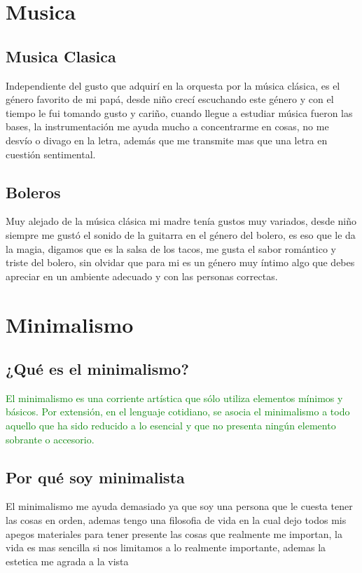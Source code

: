\documentclass[12pt, letterpaper]{article}
\begin{document}
\section{\huge{Musica}}
\subsection{\Large{Musica Clasica}}
Independiente del gusto que adquirí en la orquesta por la música clásica, es el género favorito de mi papá, desde niño crecí escuchando este género y con el tiempo le fui tomando gusto y cariño, cuando llegue a estudiar música fueron las bases, la instrumentación me ayuda mucho a concentrarme en cosas, no me desvío o divago en la letra, además que me transmite mas que una letra en cuestión sentimental.
\subsection{\Large{Boleros}}
Muy alejado de la música clásica mi madre tenía gustos muy variados, desde niño siempre me gustó el sonido de la guitarra en el género del bolero, es eso que le da la magia, digamos que es la salsa de los tacos, me gusta el sabor romántico y triste del bolero, sin olvidar que para mi es un género muy íntimo algo que debes apreciar en un ambiente adecuado y con las personas correctas.
\section{\huge{Minimalismo}}
\subsection{\Large{¿Qué es el minimalismo?}}
\textcolor{green}{El minimalismo es una corriente artística que sólo utiliza elementos mínimos y básicos. Por extensión, en el lenguaje cotidiano, se asocia el minimalismo a todo aquello que ha sido reducido a lo esencial y que no presenta ningún elemento sobrante o accesorio.}
\subsection{\Large{Por qué soy minimalista}}
El minimalismo me ayuda demasiado ya que soy una persona que le cuesta tener las cosas en orden, ademas tengo una filosofia de vida en la cual dejo todos mis apegos materiales para tener presente las cosas que realmente me importan, la vida es mas sencilla si nos limitamos a lo realmente importante, ademas la estetica me agrada a la vista 
\end{document}
